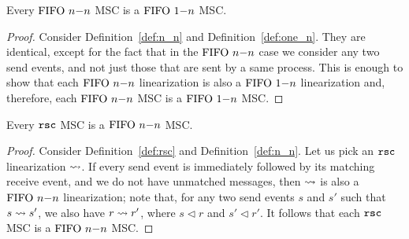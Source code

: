 	\begin{proposition} \label{prop:nn_is_onen}
		Every $\text{FIFO } n\mathsf{-}n$ MSC is a $\text{FIFO } 1\mathsf{-}n$ MSC.
	\end{proposition}
	\begin{proof}
		Consider Definition~\ref{def:n_n} and Definition~\ref{def:one_n}. They are identical, except for the fact that in the $\text{FIFO } n\mathsf{-}n$ case we consider any two send events, and not just those that are sent by a same process. This is enough to show that each $\text{FIFO } n\mathsf{-}n$ linearization is also a $\text{FIFO } 1\mathsf{-}n$ linearization and, therefore, each $\text{FIFO } n\mathsf{-}n$ MSC is a $\text{FIFO } 1\mathsf{-}n$ MSC.
	\end{proof}
	
	\begin{proposition} \label{prop:rsc_is_nn}
		Every $\mathtt{rsc}$ MSC is a $\text{FIFO } n\mathsf{-}n$ MSC.
	\end{proposition}
	\begin{proof}
		Consider Definition~\ref{def:rsc} and Definition~\ref{def:n_n}. Let us pick an $\mathtt{rsc}$ linearization $\rightsquigarrow$. If every send event is immediately followed by its matching receive event, and we do not have unmatched messages, then $\rightsquigarrow$ is also a $\text{FIFO } n\mathsf{-}n$ linearization; note that, for any two send events $s$ and $s'$ such that $s \rightsquigarrow s'$, we also have $r \rightsquigarrow r'$, where $s \lhd r$ and $s' \lhd r'$. It follows that each $\mathtt{rsc}$ MSC is a $\text{FIFO } n\mathsf{-}n$ MSC.
	\end{proof}
	